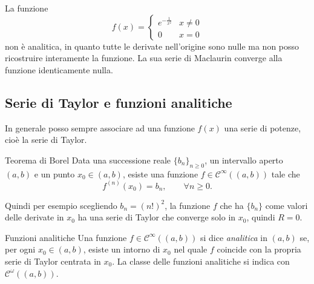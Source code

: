 \documentclass[a4paper]{article}
\begin{document}
\begin{radioactive}
\begin{snippetexample}{}
    La funzione
    \[
        f(x) =
        \begin{cases}
            e^{-\frac{1}{x^2}} & x \neq 0 \\
            0 & x = 0
        \end{cases}
    \]
    non è analitica, in quanto tutte le derivate nell'origine sono nulle
    ma non posso ricostruire interamente la funzione.
    La sua serie di Maclaurin converge alla funzione identicamente nulla.
\end{snippetexample}
\end{radioactive}

\subsection{Serie di Taylor e funzioni analitiche}

\begin{radioactive}
In generale posso sempre associare ad una funzione \(f(x)\) una serie di potenze,
cioè la serie di Taylor.
\end{radioactive}

\begin{radioactive}
\begin{snippetproposition}{Teorema di Borel}
    Data una successione reale \(\{b_n\}_{n\geq0}\), un intervallo aperto
    \((a,b)\) e un punto \(x_0\in(a,b)\), esiste una funzione
    \(f\in\mathcal C^\infty((a,b))\) tale che
    \[
        f^{(n)}(x_0)=b_n,
        \qquad \forall n\geq0.
    \]
\end{snippetproposition}
\end{radioactive}

\begin{radioactive}
Quindi per esempio scegliendo \(b_n=(n!)^2\), la funzione \(f\)
che ha \(\{b_n\}\) come valori delle derivate in \(x_0\) ha una serie di Taylor che converge solo in \(x_0\),
quindi \(R=0\).
\end{radioactive}

\begin{radioactive}
\begin{snippetdefinition}{Funzioni analitiche}
    Una funzione \(f\in\mathcal C^\infty((a,b))\) si dice \emph{analitica} in
    \((a,b)\) se, per ogni \(x_0\in(a,b)\), esiste un intorno di \(x_0\) nel quale
    \(f\) coincide con la propria serie di Taylor centrata in \(x_0\). La classe
    delle funzioni analitiche si indica con \(\mathcal C^\omega((a,b))\).
\end{snippetdefinition}
\end{radioactive}
\end{document}
